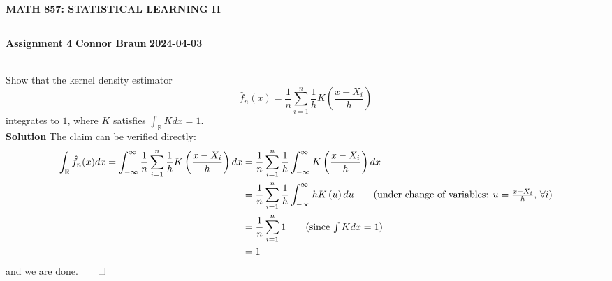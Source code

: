 \documentclass[10pt]{article}
\newcommand{\bp}[1]{\left({#1}\right)}
\newcommand{\mbb}[1]{\mathbb{#1}}
\newcommand{\1}[1]{\mathbbm{1}_{#1}}
\begin{document}
    \begin{center}
        {\bf\large{MATH 857: STATISTICAL LEARNING II}}
        \smallskip
        \hrule
        \smallskip
        {\bf Assignment 4} \hfill {\bf Connor Braun} \hfill {\bf 2024-04-03}
    \end{center}
    \\[5pt]
    Show that the kernel density estimator
    \[\hat{f}_n(x)=\frac{1}{n}\sum_{i=1}^n\frac{1}{h}K\bp{\frac{x-X_i}{h}}\]
    integrates to $1$, where $K$ satisfies $\int_{\mbb{R}} Kdx=1$.\\[5pt]
    {\bf Solution}\hspace{5pt} The claim can be verified directly:
    \begin{align*}
        \int_{\mbb{R}}\hat{f}_n(x)dx=\int_{-\infty}^\infty\frac{1}{n}\sum_{i=1}^n\frac{1}{h}K\bp{\frac{x-X_i}{h}}dx&=\frac{1}{n}\sum_{i=1}^n\frac{1}{h}\int_{-\infty}^\infty K\bp{\frac{x-X_i}{h}}dx\\
        &=\frac{1}{n}\sum_{i=1}^n\frac{1}{h}\int_{-\infty}^\infty hK\bp{u}du\tag{under change of variables: $u=\tfrac{x-X_i}{h}$, $\forall i$}\\
        &=\frac{1}{n}\sum_{i=1}^n1\tag{since $\int Kdx=1$}\\
        &=1
    \end{align*}
    and we are done.\hfill{$\qed$}\\[5pt]
\end{document}
